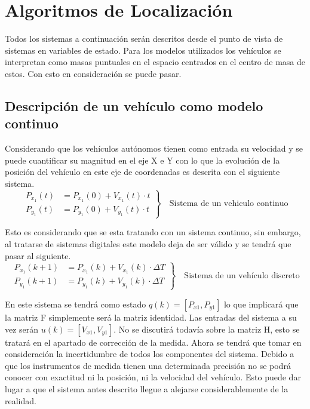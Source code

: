 
\newpage
\thispagestyle{empty}
\mbox{}
\setlength{\parskip}{4mm}
\chapter{Algoritmos de Localización}
\label{ch:chapter2}


Todos los sistemas a continuación serán descritos desde el punto de vista de sistemas en variables de estado. Para los modelos utilizados los vehículos se interpretan como masas puntuales en el espacio centrados en el centro de masa de estos. Con esto en consideración se puede pasar.

\section{Descripción de un vehículo como modelo continuo}
\par
Considerando que los vehículos autónomos tienen como entrada su velocidad y se puede cuantificar su magnitud en el eje X e Y con lo que la evolución de la posición del vehículo en este eje de coordenadas es descrita con el siguiente sistema. 
\begin{equation*}
\left.
 \begin{aligned}
P_{x_1}(t) & = P_{x_1}(0)+V_{x_1}(t)\cdot t \\
P_{y_1}(t) & = P_{y_1}(0)+V_{y_1}(t)\cdot t
\end{aligned}
\right\}
\quad\text{Sistema de un vehiculo continuo}
\end{equation*}
\par
Esto es considerando que se esta tratando con un sistema continuo, sin embargo, al tratarse de sistemas digitales este modelo deja de ser válido y se tendrá que pasar al siguiente. 
\begin{equation*}
\left.
 \begin{aligned}
P_{x_1}(k+1) & = P_{x_1}(k)+V_{x_1}(k)\cdot\Delta{T} \\
P_{y_1}(k+1) & = P_{y_1}(k)+V_{y_1}(k)\cdot\Delta{T} 
\end{aligned}
\right\}
\quad\text{Sistema de un vehículo discreto}
\end{equation*}
\par
En este sistema se tendrá como estado $q(k)=[P_{x1},P_{y1}]$ lo que implicará que la matriz F simplemente será la matriz identidad. Las entradas del sistema a su vez serán $u(k)=[V_{x1},V_{y1}]$.
No se discutirá todavía sobre la matriz H, esto se tratará en el apartado de corrección de la medida. 
Ahora se tendrá que tomar en consideración la incertidumbre de todos los componentes del sistema. Debido a que los instrumentos de medida tienen una determinada precisión no se podrá conocer con exactitud ni la posición, ni la velocidad del vehículo. Esto puede dar lugar a que el sistema antes descrito llegue a alejarse considerablemente de la realidad. 
